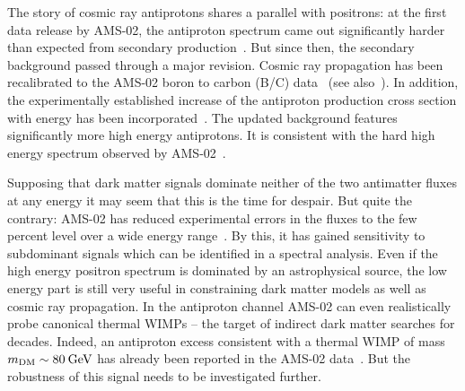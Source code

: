 \documentclass[a4paper,11pt]{article}
\newcommand{\eVdist}{\kern-0.06em}
\newcommand{\gev}{\:\text{Ge\eVdist V}}
\begin{document}
The story of cosmic ray antiprotons shares a parallel with positrons: at the first data release by AMS-02, the antiproton spectrum came out significantly harder than expected from secondary production~\cite{tingtalk:2015}. But since then, the secondary background passed through a major revision. Cosmic ray propagation has been recalibrated to the AMS-02 boron to carbon (B/C) data~\cite{Kappl:2015bqa} (see also~\cite{Giesen:2015ufa,Evoli:2015vaa}). In addition, the experimentally established increase of the antiproton production cross section with energy has been incorporated~\cite{Kachelriess:2015wpa,Winkler:2017xor}. The updated background features significantly more high energy antiprotons. It is consistent with the hard high energy spectrum observed by AMS-02~\cite{Winkler:2017xor,Boschini:2017fxq}.

Supposing that dark matter signals dominate neither of the two antimatter fluxes at any energy
it may seem that this is the time for despair. But quite the contrary: AMS-02 has reduced experimental errors in the fluxes to the few percent level over a wide energy range~\cite{Aguilar:2014mma,Aguilar:2016vqr,Aguilar:2016kjl}. By this, it has gained sensitivity to subdominant signals which can be identified in a spectral analysis. Even if the high energy positron spectrum is dominated by an astrophysical source, the low energy part is still very useful in constraining dark matter models as well as cosmic ray propagation. In the antiproton channel AMS-02 can even realistically probe canonical thermal WIMPs -- the target of indirect dark matter searches for decades. Indeed, an antiproton excess consistent with a thermal WIMP of mass $m_{\text{DM}}\sim 80\gev$ has already been reported in the AMS-02 data~\cite{Cuoco:2016eej,Cui:2016ppb}. But the robustness of this signal needs to be investigated further.
\end{document}

